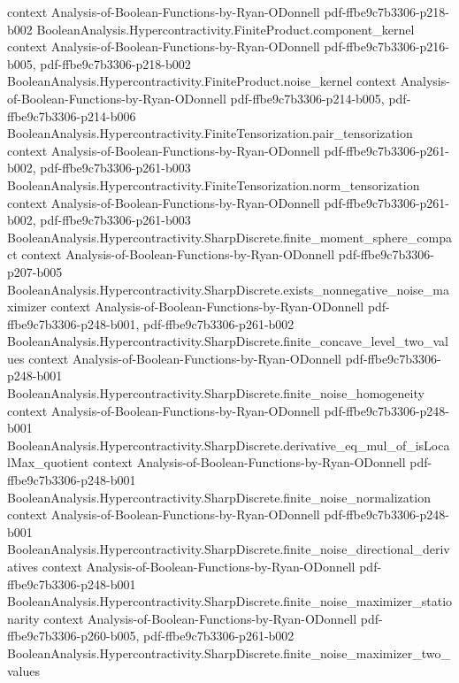 \begin{theorem}
  {context}
  {Analysis-of-Boolean-Functions-by-Ryan-ODonnell}
  {pdf-ffbe9c7b3306-p218-b002}
\proofstep
  {BooleanAnalysis.Hypercontractivity.FiniteProduct.component_kernel}
  {context}
  {Analysis-of-Boolean-Functions-by-Ryan-ODonnell}
  {pdf-ffbe9c7b3306-p216-b005,
    pdf-ffbe9c7b3306-p218-b002}
\proofstep
  {BooleanAnalysis.Hypercontractivity.FiniteProduct.noise_kernel}
  {context}
  {Analysis-of-Boolean-Functions-by-Ryan-ODonnell}
  {pdf-ffbe9c7b3306-p214-b005,
    pdf-ffbe9c7b3306-p214-b006}
\proofstep
  {BooleanAnalysis.Hypercontractivity.FiniteTensorization.pair_tensorization}
  {context}
  {Analysis-of-Boolean-Functions-by-Ryan-ODonnell}
  {pdf-ffbe9c7b3306-p261-b002,
    pdf-ffbe9c7b3306-p261-b003}
\proofstep
  {BooleanAnalysis.Hypercontractivity.FiniteTensorization.norm_tensorization}
  {context}
  {Analysis-of-Boolean-Functions-by-Ryan-ODonnell}
  {pdf-ffbe9c7b3306-p261-b002,
    pdf-ffbe9c7b3306-p261-b003}
\proofstep
  {BooleanAnalysis.Hypercontractivity.SharpDiscrete.finite_moment_sphere_compact}
  {context}
  {Analysis-of-Boolean-Functions-by-Ryan-ODonnell}
  {pdf-ffbe9c7b3306-p207-b005}
\proofstep
  {BooleanAnalysis.Hypercontractivity.SharpDiscrete.exists_nonnegative_noise_maximizer}
  {context}
  {Analysis-of-Boolean-Functions-by-Ryan-ODonnell}
  {pdf-ffbe9c7b3306-p248-b001,
    pdf-ffbe9c7b3306-p261-b002}
\proofstep
  {BooleanAnalysis.Hypercontractivity.SharpDiscrete.finite_concave_level_two_values}
  {context}
  {Analysis-of-Boolean-Functions-by-Ryan-ODonnell}
  {pdf-ffbe9c7b3306-p248-b001}
\proofstep
  {BooleanAnalysis.Hypercontractivity.SharpDiscrete.finite_noise_homogeneity}
  {context}
  {Analysis-of-Boolean-Functions-by-Ryan-ODonnell}
  {pdf-ffbe9c7b3306-p248-b001}
\proofstep
  {BooleanAnalysis.Hypercontractivity.SharpDiscrete.derivative_eq_mul_of_isLocalMax_quotient}
  {context}
  {Analysis-of-Boolean-Functions-by-Ryan-ODonnell}
  {pdf-ffbe9c7b3306-p248-b001}
\proofstep
  {BooleanAnalysis.Hypercontractivity.SharpDiscrete.finite_noise_normalization}
  {context}
  {Analysis-of-Boolean-Functions-by-Ryan-ODonnell}
  {pdf-ffbe9c7b3306-p248-b001}
\proofstep
  {BooleanAnalysis.Hypercontractivity.SharpDiscrete.finite_noise_directional_derivatives}
  {context}
  {Analysis-of-Boolean-Functions-by-Ryan-ODonnell}
  {pdf-ffbe9c7b3306-p248-b001}
\proofstep
  {BooleanAnalysis.Hypercontractivity.SharpDiscrete.finite_noise_maximizer_stationarity}
  {context}
  {Analysis-of-Boolean-Functions-by-Ryan-ODonnell}
  {pdf-ffbe9c7b3306-p260-b005,
    pdf-ffbe9c7b3306-p261-b002}
\proofstep
  {BooleanAnalysis.Hypercontractivity.SharpDiscrete.finite_noise_maximizer_two_values}

\end{theorem}
